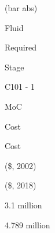 \documentclass[a4paper,portrait,12pt]{article}
\begin{document}
\begin{flushleft}
(bar abs)
\end{flushleft}





\begin{flushleft}
Fluid
\end{flushleft}





\begin{flushleft}
Required
\end{flushleft}





\begin{flushleft}
Stage
\end{flushleft}


\begin{flushleft}
C101 - 1
\end{flushleft}





\begin{flushleft}
MoC
\end{flushleft}





\begin{flushleft}
Cost
\end{flushleft}





\begin{flushleft}
Cost
\end{flushleft}





(\$, 2002)





(\$, 2018)





\begin{flushleft}
3.1 million
\end{flushleft}





\begin{flushleft}
4.789 million
\end{flushleft}
\end{document}
